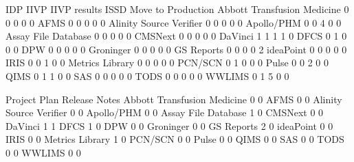 \documentclass{article}
\begin{document}
\begin{Schunk}
\begin{Soutput}
                              IDP IIVP IIVP results ISSD Move to Production
  Abbott Transfusion Medicine   0    0            0    0                  0
  AFMS                          0    0            0    0                  0
  Alinity Source Verifier       0    0            0    0                  0
  Apollo/PHM                    0    0            4    0                  0
  Assay File Database           0    0            0    0                  0
  CMSNext                       0    0            0    0                  0
  DaVinci                       1    1            1    1                  0
  DFCS                          0    1            0    0                  0
  DPW                           0    0            0    0                  0
  Groninger                     0    0            0    0                  0
  GS Reports                    0    0            0    0                  2
  ideaPoint                     0    0            0    0                  0
  IRIS                          0    0            1    0                  0
  Metrics Library               0    0            0    0                  0
  PCN/SCN                       0    1            0    0                  0
  Pulse                         0    0            2    0                  0
  QIMS                          0    1            1    0                  0
  SAS                           0    0            0    0                  0
  TODS                          0    0            0    0                  0
  WWLIMS                        0    1            5    0                  0
                             
                              Project Plan Release Notes
  Abbott Transfusion Medicine            0             0
  AFMS                                   0             0
  Alinity Source Verifier                0             0
  Apollo/PHM                             0             0
  Assay File Database                    1             0
  CMSNext                                0             0
  DaVinci                                1             1
  DFCS                                   1             0
  DPW                                    0             0
  Groninger                              0             0
  GS Reports                             2             0
  ideaPoint                              0             0
  IRIS                                   0             0
  Metrics Library                        1             0
  PCN/SCN                                0             0
  Pulse                                  0             0
  QIMS                                   0             0
  SAS                                    0             0
  TODS                                   0             0
  WWLIMS                                 0             0
                             

\end{Soutput}
\end{Schunk}
\end{document}
